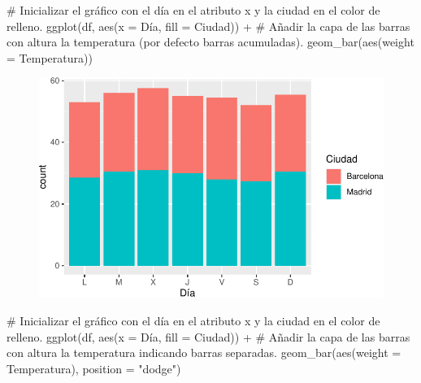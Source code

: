 \documentclass[
  a4paper,
]{scrreport}
\newenvironment{Shaded}{\begin{snugshade}}{\end{snugshade}}
\newcommand{\AttributeTok}[1]{\textcolor[rgb]{0.40,0.45,0.13}{#1}}
\newcommand{\CommentTok}[1]{\textcolor[rgb]{0.37,0.37,0.37}{#1}}
\newcommand{\FunctionTok}[1]{\textcolor[rgb]{0.28,0.35,0.67}{#1}}
\newcommand{\NormalTok}[1]{\textcolor[rgb]{0.00,0.23,0.31}{#1}}
\newcommand{\SpecialCharTok}[1]{\textcolor[rgb]{0.37,0.37,0.37}{#1}}
\newcommand{\StringTok}[1]{\textcolor[rgb]{0.13,0.47,0.30}{#1}}
\theoremstyle{definition}
\theoremstyle{definition}
\theoremstyle{remark}
\begin{document}
\begin{Shaded}
\begin{Highlighting}[]
\CommentTok{\# Inicializar el gráfico con el día en el atributo x y la ciudad en el color de relleno.}
\FunctionTok{ggplot}\NormalTok{(df, }\FunctionTok{aes}\NormalTok{(}\AttributeTok{x =}\NormalTok{ Día, }\AttributeTok{fill =}\NormalTok{ Ciudad)) }\SpecialCharTok{+}
\CommentTok{\# Añadir la capa de las barras con altura la temperatura (por defecto barras acumuladas).}
    \FunctionTok{geom\_bar}\NormalTok{(}\FunctionTok{aes}\NormalTok{(}\AttributeTok{weight =}\NormalTok{ Temperatura))}
\end{Highlighting}
\end{Shaded}

\begin{figure}[H]

{\centering \includegraphics{07-graficos_files/figure-pdf/unnamed-chunk-11-1.pdf}

}

\end{figure}

\begin{Shaded}
\begin{Highlighting}[]
\CommentTok{\# Inicializar el gráfico con el día en el atributo x y la ciudad en el color de relleno.}
\FunctionTok{ggplot}\NormalTok{(df, }\FunctionTok{aes}\NormalTok{(}\AttributeTok{x =}\NormalTok{ Día, }\AttributeTok{fill =}\NormalTok{ Ciudad)) }\SpecialCharTok{+}
\CommentTok{\# Añadir la capa de las barras con altura la temperatura indicando barras separadas.}
    \FunctionTok{geom\_bar}\NormalTok{(}\FunctionTok{aes}\NormalTok{(}\AttributeTok{weight =}\NormalTok{ Temperatura), }\AttributeTok{position =} \StringTok{"dodge"}\NormalTok{)}
\end{Highlighting}
\end{Shaded}
\end{document}
